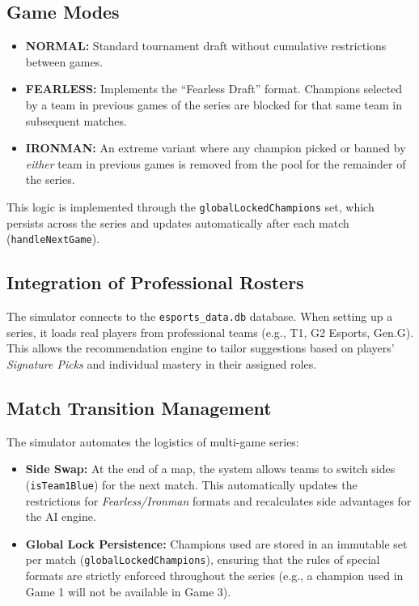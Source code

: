 \documentclass[12pt, a4paper]{article}
\begin{document}
    \subsection{Game Modes}
    \begin{itemize}
        \item \textbf{NORMAL:} Standard tournament draft without cumulative restrictions between games.
        \item \textbf{FEARLESS:} Implements the ``Fearless Draft'' format. Champions selected by a team in previous games of the series are blocked for that same team in subsequent matches.
        \item \textbf{IRONMAN:} An extreme variant where any champion picked or banned by \textit{either} team in previous games is removed from the pool for the remainder of the series.
    \end{itemize}

    This logic is implemented through the \texttt{globalLockedChampions} set, which persists across the series and updates automatically after each match (\texttt{handleNextGame}).

    \subsection{Integration of Professional Rosters}
    The simulator connects to the \texttt{esports\_data.db} database. When setting up a series, it loads real players from professional teams (e.g., T1, G2 Esports, Gen.G). This allows the recommendation engine to tailor suggestions based on players’ \textit{Signature Picks} and individual mastery in their assigned roles.

    \subsection{Match Transition Management}
    The simulator automates the logistics of multi-game series:
    \begin{itemize}
        \item \textbf{Side Swap:} At the end of a map, the system allows teams to switch sides (\texttt{isTeam1Blue}) for the next match. This automatically updates the restrictions for \textit{Fearless/Ironman} formats and recalculates side advantages for the AI engine.
        \item \textbf{Global Lock Persistence:} Champions used are stored in an immutable set per match (\texttt{globalLockedChampions}), ensuring that the rules of special formats are strictly enforced throughout the series (e.g., a champion used in Game 1 will not be available in Game 3).
    \end{itemize}
\end{document}

